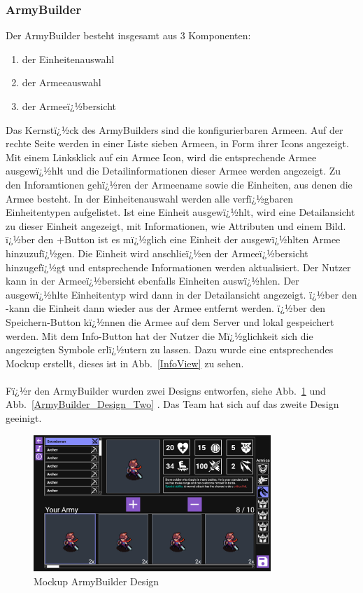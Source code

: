 \documentclass[12pt, titlepage]{scrartcl}
\newcommand{\RN}[1]{%
	\textup{\uppercase\expandafter{\romannumeral#1}}%
}
\newcommand{\Abb}[1]{%
	Abb.\ \ref{#1}%
}
\begin{document}
		\subsubsection{ArmyBuilder}
			Der ArmyBuilder besteht insgesamt aus 3 Komponenten:
			\begin{enumerate}
				\item der Einheitenauswahl
				\item der Armeeauswahl
				\item der Armeeï¿½bersicht
			\end{enumerate}
		Das Kernstï¿½ck des ArmyBuilders sind die konfigurierbaren Armeen. Auf der rechte Seite werden in einer Liste sieben Armeen, in Form ihrer Icons angezeigt. Mit einem Linksklick auf ein Armee Icon, wird die entsprechende Armee ausgewï¿½hlt und die Detailinformationen dieser Armee werden angezeigt. Zu den Inforamtionen gehï¿½ren der Armeename sowie die Einheiten, aus denen die Armee besteht. In der Einheitenauswahl werden alle verfï¿½gbaren Einheitentypen aufgelistet. Ist eine Einheit ausgewï¿½hlt, wird eine Detailansicht zu dieser Einheit angezeigt, mit Informationen, wie Attributen und einem Bild. ï¿½ber den \glqq +\grqq Button ist es mï¿½glich eine Einheit der ausgewï¿½hlten Armee hinzuzufï¿½gen. Die Einheit wird anschlieï¿½en der Armeeï¿½bersicht hinzugefï¿½gt und entsprechende Informationen werden aktualisiert. Der Nutzer kann in der Armeeï¿½bersicht ebenfalls Einheiten auswï¿½hlen. Der ausgewï¿½hlte Einheitentyp wird dann in der Detailansicht angezeigt. ï¿½ber den \glqq -\grqq kann die Einheit dann wieder aus der Armee entfernt werden. ï¿½ber den \glqq Speichern\grqq-Button kï¿½nnen die Armee auf dem Server und lokal gespeichert werden. Mit dem \glqq Info\grqq-Button hat der Nutzer die Mï¿½glichkeit sich die angezeigten Symbole erlï¿½utern zu lassen. Dazu wurde eine entsprechendes Mockup erstellt, dieses ist in \Abb{InfoView} zu sehen.\\ \\ Fï¿½r den ArmyBuilder wurden zwei Designs entworfen, siehe \Abb{ArmyBuilder_Design_One} und \Abb{ArmyBuilder_Design_Two}. Das Team hat sich auf das zweite Design geeinigt. 
		\begin{figure}[H] 
			\centering
			\includegraphics[width=0.8\textwidth]{ArmyBuilder_Design_One.png}
			\caption{Mockup ArmyBuilder Design \RN{1} }
			\label{ArmyBuilder_Design_One}
		\end{figure}
\end{document}
